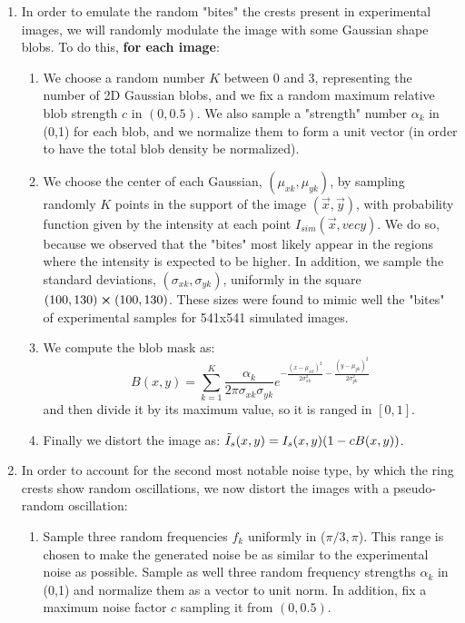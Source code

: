 \documentclass[11pt, a4paper, twoside]{article} %
\begin{document}
\begin{enumerate}
\item In order to emulate the random "bites" the crests present in experimental images, we will randomly modulate the image with some Gaussian shape blobs. To do this, {\bf for each image}:
\begin{enumerate}
\item We choose a random number $K$ between 0 and 3, representing the number of 2D Gaussian blobs, and we fix a random maximum relative blob strength $c$ in $(0,0.5)$. We also sample a "strength" number $\alpha_k$ in (0,1) for each blob, and we normalize them to form a unit vector (in order to have the total blob density be normalized).
\item We choose the center of each Gaussian, $(\mu_{xk},\mu_{yk})$, by sampling randomly $K$ points in the support of the image $(\vec{x},\vec{y})$, with probability function given by the intensity at each point $I_{sim}(\vec{x},	vec{y})$. We do so, because we observed that the "bites" most likely appear in the regions where the intensity is expected to be higher. In addition, we sample the standard deviations, $(\sigma_{xk},\sigma_{yk})$, uniformly in the square $(100,130)\cross(100,130)$. These sizes were found to mimic well the "bites" of experimental samples for 541x541 simulated images.
\item We compute the blob mask as:\vspace{-0.2cm}
\begin{equation}
B(x,y)=\sum_{k=1}^K \frac{\alpha_k}{2\pi\sigma_{xk}\sigma_{yk}}e^{-\frac{(x-\mu_{xk})^2}{2\sigma_{xk}^2}-\frac{(y-\mu_{yk})^2}{2\sigma_{yk}^2}}
\end{equation}
and then divide it by its maximum value, so it is ranged in $[0,1]$.
\item Finally we distort the image as: $
\tilde{I}_s(x,y)=I_s(x,y)\qty(1-cB(x,y))$.
\end{enumerate}
\item In order to account for the second most notable noise type, by which the ring crests show random oscillations, we now distort the images with a pseudo-random oscillation:
\begin{enumerate}
\item Sample three random frequencies $f_k$ uniformly in ($\pi/3,\pi$). This range is chosen to make the generated noise be as similar to the experimental noise as possible. Sample as well three random frequency strengths $\alpha_k$ in (0,1) and normalize them as a vector to unit norm. In addition, fix a maximum noise factor $c$ sampling it from $(0,0.5)$.

\end{enumerate}
\end{enumerate}
\end{document}
